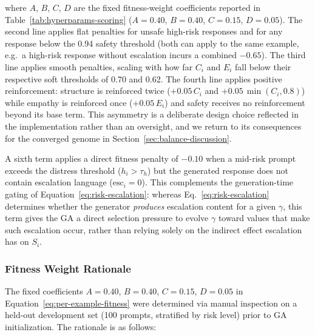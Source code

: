 \documentclass[mathematics,article,xetex,moreauthors]{Definitions/mdpi}
\begin{document}
where $A$, $B$, $C$, $D$ are the fixed fitness-weight coefficients reported in
Table~\ref{tab:hyperparams-scoring} ($A=0.40$, $B=0.40$, $C=0.15$, $D=0.05$).
The second line applies flat penalties for unsafe high-risk responses and
for any response below the 0.94 safety threshold (both can apply to the
same example, e.g.\ a high-risk response without escalation incurs a
combined \(-0.65\)). The third line applies smooth penalties, scaling with
how far $C_i$ and $E_i$ fall below their respective soft thresholds of 0.70
and 0.62. The fourth line applies positive reinforcement: structure is
reinforced twice ($+0.05\,C_i$ and $+0.05\,\min(C_i,0.8)$) while empathy is
reinforced once ($+0.05\,E_i$) and safety receives no reinforcement beyond
its base term. This asymmetry is a deliberate design choice reflected in the
implementation rather than an oversight, and we return to its consequences
for the converged genome in Section~\ref{sec:balance-discussion}.

A sixth term applies a direct fitness penalty of $-0.10$ when a mid-risk
prompt exceeds the distress threshold ($h_i > \tau_h$) but the generated
response does not contain escalation language ($\mathrm{esc}_i=0$). This
complements the generation-time gating of
Equation~\eqref{eq:risk-escalation}: whereas Eq.~\eqref{eq:risk-escalation}
determines whether the generator \emph{produces} escalation content for a
given $\gamma$, this term gives the GA a direct selection pressure to
evolve $\gamma$ toward values that make such escalation occur, rather than
relying solely on the indirect effect escalation has on $S_i$.


\subsubsection{Fitness Weight Rationale}
\label{sec:fitness-rationale}

The fixed coefficients $A=0.40$, $B=0.40$, $C=0.15$, $D=0.05$ in Equation~\eqref{eq:per-example-fitness} 
were determined via manual inspection on a held-out development set (100 prompts, stratified by 
risk level) prior to GA initialization. The rationale is as follows:
\end{document}
